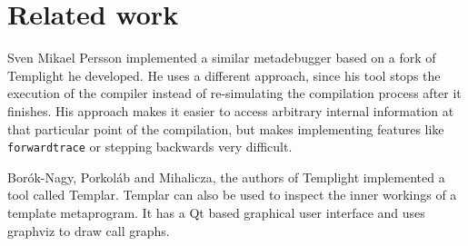 
\chapter{Related work} \label{relatedwork}

Sven Mikael Persson implemented a similar metadebugger based on a fork of
Templight he developed\cite{persson-templight}. He uses a different approach,
since his tool stops the execution of the compiler instead of re-simulating
the compilation process after it finishes. His approach makes it easier to
access arbitrary internal information at that particular point of the
compilation, but makes implementing features like \texttt{forwardtrace} or
stepping backwards very difficult.

Borók-Nagy, Porkoláb and Mihalicza, the authors of Templight\cite{templight}
implemented a tool called Templar\cite{templar}. Templar can also be used to
inspect the inner workings of a template metaprogram. It has a Qt\cite{qt}
based graphical user interface and uses graphviz\cite{graphviz} to draw call
graphs.
